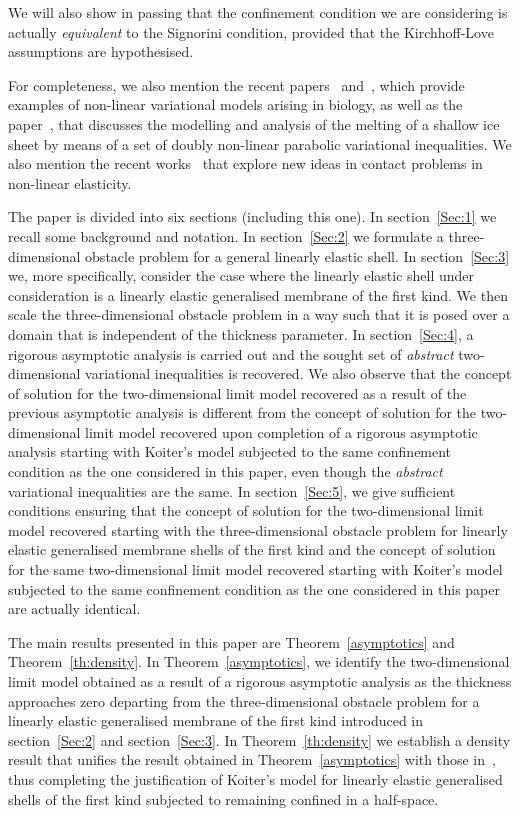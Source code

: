 \documentclass{amsart}
\begin{document}
We will also show in passing that the confinement condition we are considering is actually \emph{equivalent} to the Signorini condition, provided that the Kirchhoff-Love assumptions are hypothesised.

For completeness, we also mention the recent papers~\cite{PWDT2D} and~\cite{PWDT3D}, which provide examples of non-linear variational models arising in biology, as well as the paper~\cite{PieTem2023}, that discusses the modelling and analysis of the melting of a shallow ice sheet by means of a set of doubly non-linear parabolic variational inequalities. We also mention the recent works~\cite{HeaNai24, LK24} that explore new ideas in contact problems in non-linear elasticity.

The paper is divided into six sections (including this one). In section~\ref{Sec:1} we recall some background and notation. In section~\ref{Sec:2} we formulate a three-dimensional obstacle problem for a general linearly elastic shell. In section~\ref{Sec:3} we, more specifically, consider the case where the linearly elastic shell under consideration is a linearly elastic generalised membrane of the first kind. We then scale the three-dimensional obstacle problem in a way such that it is posed over a domain that is independent of the thickness parameter. In section~\ref{Sec:4}, a rigorous asymptotic analysis is carried out and the sought set of \emph{abstract} two-dimensional variational inequalities is recovered. We also observe that the concept of solution for the two-dimensional limit model recovered as a result of the previous asymptotic analysis is different from the concept of solution for the two-dimensional limit model recovered upon completion of a rigorous asymptotic analysis starting with Koiter's model subjected to the same confinement condition as the one considered in this paper, even though the \emph{abstract} variational inequalities are the same.
In section~\ref{Sec:5}, we give sufficient conditions ensuring that the concept of solution for the two-dimensional limit model recovered starting with the three-dimensional obstacle problem for linearly elastic generalised membrane shells of the first kind and the concept of solution for the same two-dimensional limit model recovered starting with Koiter's model subjected to the same confinement condition as the one considered in this paper are actually identical.

The main results presented in this paper are Theorem~\ref{asymptotics} and Theorem~\ref{th:density}. In Theorem~\ref{asymptotics}, we identify the two-dimensional limit model obtained as a result of a rigorous asymptotic analysis as the thickness approaches zero departing from the three-dimensional obstacle problem for a linearly elastic generalised membrane of the first kind introduced in section~\ref{Sec:2} and section~\ref{Sec:3}. In Theorem~\ref{th:density} we establish a density result that unifies the result obtained in Theorem~\ref{asymptotics} with those in~\cite{CiaPie2018b,CiaPie2018bCR}, thus completing the justification of Koiter's model for linearly elastic generalised shells of the first kind subjected to remaining confined in a half-space.
\end{document}
